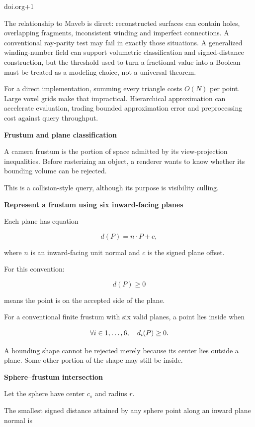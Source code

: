 doi.org+1

The relationship to Maveb is direct: reconstructed surfaces can contain holes, overlapping fragments, inconsistent winding and imperfect connections. A conventional ray-parity test may fail in exactly those situations. A generalized winding-number field can support volumetric classification and signed-distance construction, but the threshold used to turn a fractional value into a Boolean must be treated as a modeling choice, not a universal theorem.

For a direct implementation, summing every triangle costs \(O(N)\) per point. Large voxel grids make that impractical. Hierarchical approximation can accelerate evaluation, trading bounded approximation error and preprocessing cost against query throughput.

\textbf{Frustum and plane classification}

A camera frustum is the portion of space admitted by its view-projection inequalities. Before rasterizing an object, a renderer wants to know whether its bounding volume can be rejected.

This is a collision-style query, although its purpose is visibility culling.

\textbf{Represent a frustum using six inward-facing planes}

Each plane has equation

\[
d(P)=n\cdot P+c,
\]

where \(n\) is an inward-facing unit normal and \(c\) is the signed plane offset.

For this convention:

\[
d(P)\ge0
\]

means the point is on the accepted side of the plane.

For a conventional finite frustum with six valid planes, a point lies inside when

\[
\forall i\in\\{1,\ldots,6\\},\quad d_i(P)\ge0.
\]

A bounding shape cannot be rejected merely because its center lies outside a plane. Some other portion of the shape may still be inside.

\textbf{Sphere--frustum intersection}

Let the sphere have center \(c_s\) and radius \(r\).

The smallest signed distance attained by any sphere point along an inward plane normal is

